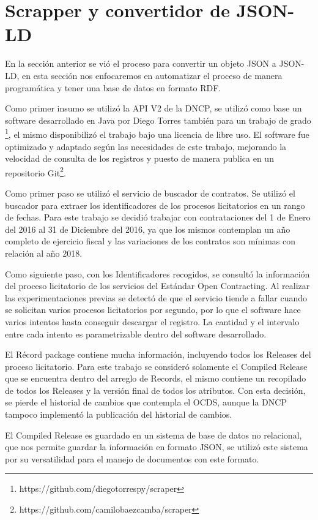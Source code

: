 \section{Scrapper y convertidor de JSON-LD}

En la sección anterior se vió el proceso para convertir un objeto JSON a JSON-LD, en esta sección nos enfocaremos en automatizar el proceso de manera programática y tener una base de datos en formato RDF.

Como primer insumo se utilizó la API V2 de la DNCP, se utilizó como base un software desarrollado en Java por Diego Torres también para un trabajo de grado \footnote{https://github.com/diegotorrespy/scraper}, el mismo disponibilizó el trabajo bajo una licencia de libre uso. El software fue optimizado y adaptado según las necesidades de este trabajo, mejorando la velocidad de consulta de los registros y puesto de manera publica en un repositorio Git\footnote{https://github.com/camilobaezcamba/scraper}.

Como primer paso se utilizó el servicio de buscador de contratos. Se utilizó el buscador para extraer los identificadores de los procesos licitatorios en un rango de fechas. Para este trabajo se decidió trabajar con contrataciones del 1 de Enero del 2016 al 31 de Diciembre del 2016, ya que los mismos contemplan un año completo de ejercicio fiscal y las variaciones de los contratos son mínimas con relación al año 2018.



Como siguiente paso, con los Identificadores recogidos, se consultó la información del proceso licitatorio de los servicios del Estándar Open Contracting. Al realizar las experimentaciones previas se detectó de que el servicio tiende a fallar cuando se solicitan varios procesos licitatorios por segundo, por lo que el software hace varios intentos hasta conseguir descargar el registro. La cantidad y el intervalo entre cada intento es parametrizable dentro del software desarrollado.

El Récord package contiene mucha información, incluyendo todos los Releases del proceso licitatorio. Para este trabajo se consideró solamente el Compiled Release que se encuentra dentro del arreglo de Records, el mismo contiene un recopilado de todos los Releases y la versión final de todos los atributos. Con esta decisión, se pierde el historial de cambios que contempla el OCDS, aunque la DNCP tampoco implementó la publicación del historial de cambios.

El Compiled Release es guardado en un sistema de base de datos no relacional, que nos permite guardar la información en formato JSON, se utilizó este sistema por su versatilidad para el manejo de documentos con este formato.

